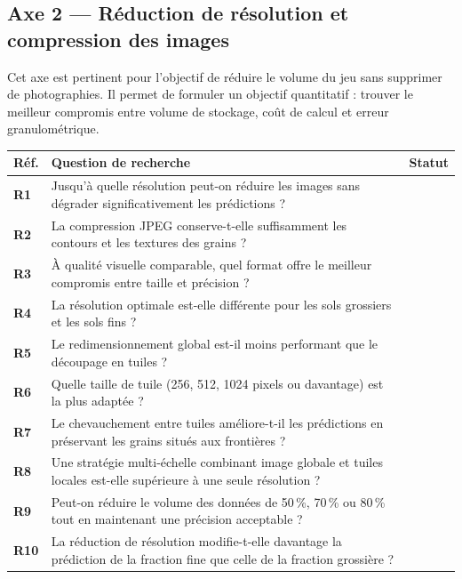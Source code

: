 \documentclass[11pt,a4paper]{article}
\makeatletter
\newenvironment{qtable}{%
  \par\smallskip
  \begin{longtable}{@{}>{\bfseries}p{1.0cm} p{12.3cm} p{1.5cm}@{}}
  \toprule
  \textbf{Réf.} & \textbf{Question de recherche} & \textbf{Statut}\\
  \midrule
  \endhead
}{%
  \bottomrule
  \end{longtable}
}
\makeatother
\begin{document}
\subsection*{Axe 2 --- Réduction de résolution et compression des images}
Cet axe est pertinent pour l'objectif de réduire le volume du jeu sans supprimer de photographies. Il permet de formuler un objectif quantitatif : trouver le meilleur compromis entre volume de stockage, coût de calcul et erreur granulométrique.
\begin{qtable}
R1 & Jusqu'à quelle résolution peut-on réduire les images sans dégrader significativement les prédictions ? & \\
R2 & La compression JPEG conserve-t-elle suffisamment les contours et les textures des grains ? & \\
R3 & À qualité visuelle comparable, quel format offre le meilleur compromis entre taille et précision ? & \\
R4 & La résolution optimale est-elle différente pour les sols grossiers et les sols fins ? & \\
R5 & Le redimensionnement global est-il moins performant que le découpage en tuiles ? & \\
R6 & Quelle taille de tuile (256, 512, 1024 pixels ou davantage) est la plus adaptée ? & \\
R7 & Le chevauchement entre tuiles améliore-t-il les prédictions en préservant les grains situés aux frontières ? & \\
R8 & Une stratégie multi-échelle combinant image globale et tuiles locales est-elle supérieure à une seule résolution ? & \\
R9 & Peut-on réduire le volume des données de 50\,\%, 70\,\% ou 80\,\% tout en maintenant une précision acceptable ? & \\
R10 & La réduction de résolution modifie-t-elle davantage la prédiction de la fraction fine que celle de la fraction grossière ? & \\
\end{qtable}
\end{document}
